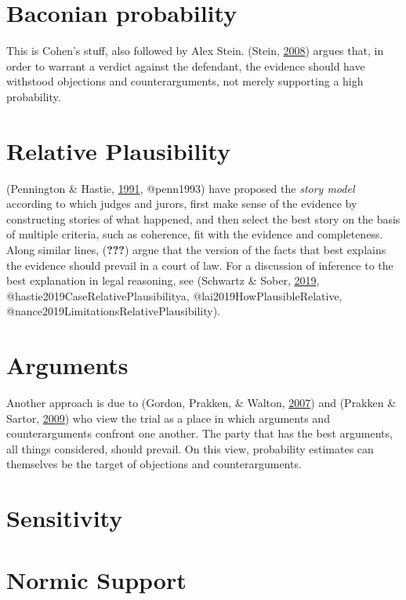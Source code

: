 \documentclass[]{book}
\begin{document}
\section{Baconian probability}

This is Cohen's stuff, also followed by Alex Stein. (Stein, \protect\hyperlink{ref-stein2008}{2008}) argues that, in order to warrant a verdict against the defendant, the evidence should have withstood objections and counterarguments, not merely supporting a high probability.

\section{Relative Plausibility}

(Pennington \& Hastie, \protect\hyperlink{ref-Pennington1991}{1991}, @penn1993) have proposed the \textit{story model} according to which judges and jurors, first make sense of the evidence by constructing stories of what happened, and then select the best story on the basis of multiple criteria, such as coherence, fit with the evidence and completeness.
Along similar lines, ({\textbf{???}}) argue that the version of the facts that best explains the evidence should prevail in a court of law. For a discussion of inference to the best explanation in legal reasoning, see (Schwartz \& Sober, \protect\hyperlink{ref-schwartz2019WhatRelativePlausibility}{2019}, @hastie2019CaseRelativePlausibilitya, @lai2019HowPlausibleRelative, @nance2019LimitationsRelativePlausibility).

\section{Arguments}

Another approach is due to (Gordon, Prakken, \& Walton, \protect\hyperlink{ref-gordon2007}{2007}) and (Prakken \& Sartor, \protect\hyperlink{ref-prakken2009}{2009}) who view the trial as a place in which arguments and counterarguments confront one another. The party that has the best arguments, all things considered, should prevail. On this view, probability estimates can themselves be the target of objections and counterarguments.

\section{Sensitivity}

\section{Normic Support}
\end{document}
